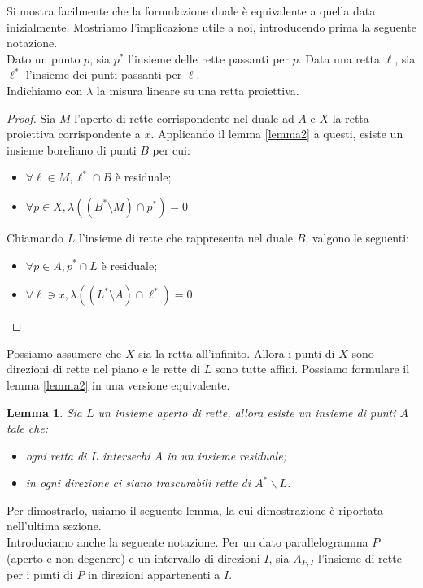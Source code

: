 \documentclass[a4paper, twoside,openright]{article}
\newcommand{\fa}{\forall}
\newcommand{\<}{\langle}
\renewcommand{\>}{\rangle}
\newtheorem{lemma}[teo]{Lemma}
\begin{document}
	Si mostra facilmente che la formulazione duale è equivalente a quella data inizialmente. Mostriamo l'implicazione utile a noi, introducendo prima la seguente notazione.\\
	Dato un punto $p$, sia $p^*$ l'insieme delle rette passanti per $p$. Data una retta $\ell$, sia $\ell^*$ l'insieme dei punti passanti per $\ell$.\\
	Indichiamo con $\lambda$ la misura lineare su una retta proiettiva.
	
\begin{proof} 
	Sia $M$ l'aperto di rette corrispondente nel duale ad $A$ e $X$ la retta proiettiva corrispondente a $x$. Applicando il lemma \ref{lemma2} a questi, esiste un insieme boreliano di punti $B$ per cui:
	\begin{itemize}
		\item $\fa \ell \in M, \ell^* \cap B$ è residuale;
		\item $\fa p \in X, \lambda((B^* \setminus M) \cap p^*)=0$
	\end{itemize}
	Chiamando $L$ l'insieme di rette che rappresenta nel duale $B$, valgono le seguenti:
	\begin{itemize}
		\item 	$\fa p \in A, p^* \cap L$ è residuale;
		\item 	$\fa \ell \ni x, \lambda((L^* \setminus A) \cap \ell^*)=0$
	\end{itemize}
\end{proof}

Possiamo assumere che $X$ sia la retta all'infinito. Allora i punti di $X$ sono direzioni di rette nel piano e le rette di $L$ sono tutte affini. Possiamo formulare il lemma \ref{lemma2} in una versione equivalente.

\begin{lemma} \label{lemma2bello}
Sia $L$ un insieme aperto di rette, allora esiste un insieme di punti $A$ tale che:
\begin{itemize}
	\item ogni retta di $L$ intersechi $A$ in un insieme residuale;
	\item in ogni direzione ci siano trascurabili rette di  $A^{*} \backslash L$.
\end{itemize}
\end{lemma}

Per dimostrarlo, usiamo il seguente lemma, la cui dimostrazione è riportata nell'ultima sezione.\\
Introduciamo anche la seguente notazione. Per un dato parallelogramma $P$ (aperto e non degenere) e un intervallo di direzioni $I$, sia $A_{P, I}$ l'insieme di rette per i punti di $P$ in direzioni appartenenti a $I$.
\end{document}
